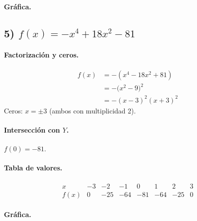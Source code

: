 \documentclass[12pt,a4paper]{article}
\begin{document}
	\paragraph{Gráfica.}
	
	\bigskip
	
	\subsection*{5) \(f(x)=-x^{4}+18x^{2}-81\)}
	\paragraph{Factorización y ceros.}
	\begin{align*}
		f(x) &= -(x^{4}-18x^{2}+81)\\
		&= -\bigl(x^{2}-9\bigr)^{2}\\
		&= -(x-3)^{2}(x+3)^{2}
	\end{align*}
	Ceros: \(x=\pm 3\) (ambos con multiplicidad 2).
	
	\paragraph{Intersección con \(Y\).} \(f(0)=-81\).
	
	\paragraph{Tabla de valores.}
	\[
	\begin{array}{c|rrrrrrr}
		x & -3 & -2 & -1 & 0 & 1 & 2 & 3\\\hline
		f(x) & 0 & -25 & -64 & -81 & -64 & -25 & 0
	\end{array}
	\]
	
	\paragraph{Gráfica.}
	
\end{document}
